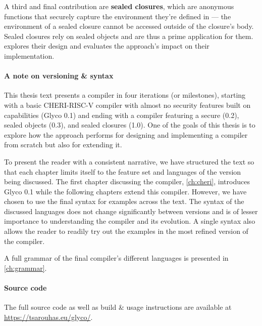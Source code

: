 \documentclass[main.tex]{subfiles}
\begin{document}
A third and final contribution are \textbf{sealed closures}, which are anonymous functions that securely capture the environment they're defined in — the environment of a sealed closure cannot be accessed outside of the closure's body. Sealed closures rely on sealed objects and are thus a prime application for them.  explores their design and evaluates the  approach's impact on their implementation.

\paragraph{A note on versioning \& syntax} This thesis text presents a compiler in four iterations (or milestones), starting with a basic CHERI-RISC-V compiler with almost no security features built on capabilities (Glyco 0.1) and ending with a compiler featuring a secure  (0.2), sealed objects (0.3), and sealed closures (1.0). One of the goals of this thesis is to explore how the  approach performs for designing and implementing a compiler from scratch but also for extending it.

To present the reader with a consistent narrative, we have structured the text so that each chapter limits itself to the feature set and languages of the version being discussed. The first chapter discussing the compiler, \cref{ch:cheri}, introduces Glyco 0.1 while the following chapters extend this compiler. However, we have chosen to use the final syntax for examples across the text. The syntax of the discussed languages does not change significantly between versions and is of lesser importance to understanding the compiler and its evolution. A single syntax also allows the reader to readily try out the examples in the most refined version of the compiler.

A full grammar of the final compiler's different languages is presented in \cref{ch:grammar}.

\paragraph{Source code} The full source code as well as build \& usage instructions are available at \url{https://tsarouhas.eu/glyco/}.

\biblio{}
\onlyinsubfile{\glsaddall\printglossaries}
\end{document}
